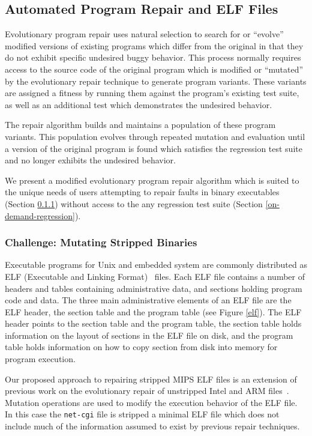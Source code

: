 \documentclass{sigcomm-alternate}
\begin{document}
\subsection{Automated Program Repair and ELF Files}
\label{sec-3-2}

Evolutionary program repair
\cite{forrest2009genetic,genprog-tse-journal,le2012representations,legoues2011systematicstudy}
uses natural selection to search for or ``evolve'' modified versions
of existing programs which differ from the original in that they do
not exhibit specific undesired buggy behavior.  This process normally
requires access to the source code of the original program which is
modified or ``mutated'' by the evolutionary repair technique to
generate program variants.  These variants are assigned a fitness by
running them against the program's existing test suite, as well as an
additional test which demonstrates the undesired behavior.

The repair algorithm builds and maintains a population of these
program variants.  This population evolves through repeated mutation
and evaluation until a version of the original program is found which
satisfies the regression test suite and no longer exhibits the
undesired behavior.

We present a modified evolutionary program repair algorithm which is
suited to the unique needs of users attempting to repair faults in
binary executables (Section \ref{mutate-mips}) without access to the
any regression test suite (Section \ref{on-demand-regression}).

\subsubsection{Challenge: Mutating Stripped Binaries}
\label{mutate-mips}

Executable programs for Unix and embedded system are commonly distributed
as ELF (Executable and Linking Format)~\cite{tis1995tool} files. 
Each ELF file contains a number of headers
and tables containing administrative data, and sections holding
program code and data.  The three main administrative elements of an
ELF file are the ELF header, the section table and the program table
(see Figure \ref{elf}).  The ELF header points to the section table and the
program table, the section table holds information on the layout of
sections in the ELF file on disk, and the program table holds
information on how to copy section from disk into memory for program
execution.

Our proposed approach to repairing stripped MIPS ELF files is an extension
of previous work on the evolutionary repair of unstripped Intel and ARM
files~\cite{schulte2013embedded}. 
Mutation operations are used to modify the
execution behavior of the ELF file.  In this case the \texttt{net-cgi} file
is stripped a minimal ELF file which does not include much of the
information assumed to exist by previous repair techniques.
\end{document}
